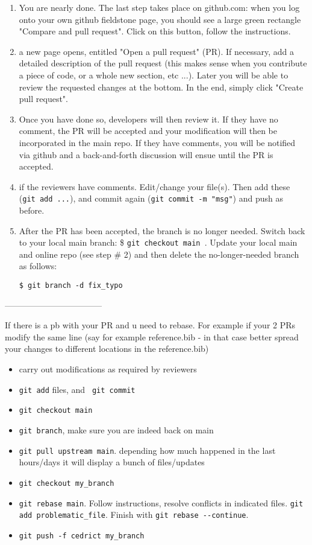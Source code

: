 \begin{enumerate}
\item You are nearly done. The last step takes place on github.com: when you log onto 
your own github fieldstone page, you should see a large green rectangle "Compare and pull request".
Click on this button, follow the instructions.

\item a new page opens, entitled "Open a pull request" (PR). If necessary, add a detailed description of 
the pull request (this makes sense when you contribute a piece of code, or a whole new section, etc ...).
Later you will be able to review the requested changes at the bottom. In the end, simply click "Create pull request".

\item Once you have done so, \aspect developers will then review it. 
If they have no comment, the PR will be accepted and your modification will 
then be incorporated in the main repo. If they have comments, you will be notified via github and a 
back-and-forth discussion will ensue until the PR is accepted. 

\item if the reviewers have comments. Edit/change your file(s). 
Then add these (\verb'git add ...'), and commit again (\verb'git commit -m "msg"')
and push as before. 



\item After the PR has been accepted, the branch is no longer needed. Switch back to your local main branch:
\$ \verb"git checkout main ".
Update your local main and online repo (see step \# 2) and then delete the no-longer-needed 
branch as follows:
\begin{verbatim}
$ git branch -d fix_typo
\end{verbatim}
\end{enumerate}

-----------------------------------

If there is a pb with your PR and u need to rebase. For example if your 2 PRs modify the same line (say for example reference.bib - 
in that case better spread your changes to different locations in the reference.bib)

\begin{itemize}
\item carry out modifications as required by reviewers
\item \verb'git add' files, and \verb' git commit'
\item \verb'git checkout main'
\item \verb'git branch', make sure you are indeed back on main
\item \verb'git pull upstream main'. depending how much happened in the last hours/days it will display a bunch of files/updates
\item \verb'git checkout my_branch'
\item \verb'git rebase main'. Follow instructions, resolve conflicts in indicated files. 
\verb'git add problematic_file'. 
Finish with \verb'git rebase --continue'. 
\item \verb'git push -f cedrict my_branch'
\end{itemize}

